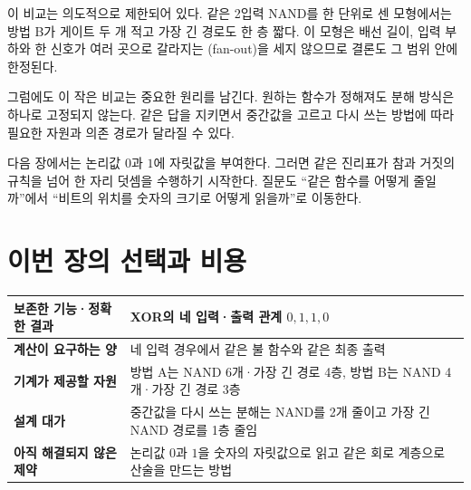 이 비교는 의도적으로 제한되어 있다. 같은 2입력 NAND를 한 단위로 센 모형에서는 방법 B가 게이트 두 개 적고 가장 긴 경로도 한 층 짧다. 이 모형은 배선 길이, 입력 부하와 한 신호가 여러 곳으로 갈라지는 (fan-out)을 세지 않으므로 결론도 그 범위 안에 한정된다.

그럼에도 이 작은 비교는 중요한 원리를 남긴다. 원하는 함수가 정해져도 분해 방식은 하나로 고정되지 않는다. 같은 답을 지키면서 중간값을 고르고 다시 쓰는 방법에 따라 필요한 자원과 의존 경로가 달라질 수 있다.

다음 장에서는 논리값 $0$과 $1$에 자릿값을 부여한다. 그러면 같은 진리표가 참과 거짓의 규칙을 넘어 한 자리 덧셈을 수행하기 시작한다. 질문도 ``같은 함수를 어떻게 줄일까''에서 ``비트의 위치를 숫자의 크기로 어떻게 읽을까''로 이동한다.

\section*{이번 장의 선택과 비용}

\begin{center}
\small
\begin{tabular}{>{\raggedright\arraybackslash\sffamily\bfseries}p{} >{\raggedright\arraybackslash}p{}}
\toprule
보존한 기능·정확한 결과 & XOR의 네 입력·출력 관계 $0,1,1,0$ \\
\midrule
계산이 요구하는 양 & 네 입력 경우에서 같은 불 함수와 같은 최종 출력 \\
\midrule
기계가 제공할 자원 & 방법 A는 NAND 6개·가장 긴 경로 4층, 방법 B는 NAND 4개·가장 긴 경로 3층 \\
\midrule
설계 대가 & 중간값을 다시 쓰는 분해는 NAND를 2개 줄이고 가장 긴 NAND 경로를 1층 줄임 \\
\midrule
아직 해결되지 않은 제약 & 논리값 $0$과 $1$을 숫자의 자릿값으로 읽고 같은 회로 계층으로 산술을 만드는 방법 \\
\bottomrule
\end{tabular}
\end{center}
